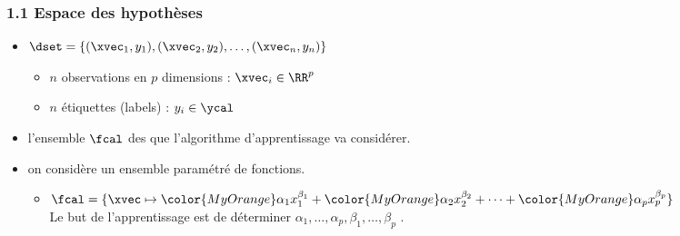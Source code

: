 \begin{frame}
  \frametitle{1.1 Espace des hypothèses}
  \begin{itemize}
  \item {} $\dset = \{(\xvec_1, y_1), (\xvec_2, y_2), \dots, (\xvec_n, y_n)\} $ 
    \begin{itemize}
    \item $n$ observations en $p$ dimensions : $\xvec_i \in  \RR^p$
    \item $n$ étiquettes \textcolor{gray!70}{(labels)} : $y_i \in \ycal$
    \end{itemize}
    \pause
  \item {} l'ensemble $\fcal$ des  que
    l'algorithme d'apprentissage va considérer.  \pause
  \item {} on considère un ensemble paramétré de fonctions.
    \begin{itemize}
    \item[]  
      $\fcal = \{ \xvec \mapsto {\color{MyOrange}\alpha_1} x_1^{\beta_1} +
      {\color{MyOrange}\alpha_2} x_2^{\beta_2} + \dots + {\color{MyOrange}\alpha_p} x_p^{\beta_p} \}$ \\
      Le but de l'apprentissage est de déterminer $\alpha_1, \dots, \alpha_p, \beta_1, \dots, \beta_p$ .
    \end{itemize}
  \end{itemize}
\end{frame}

